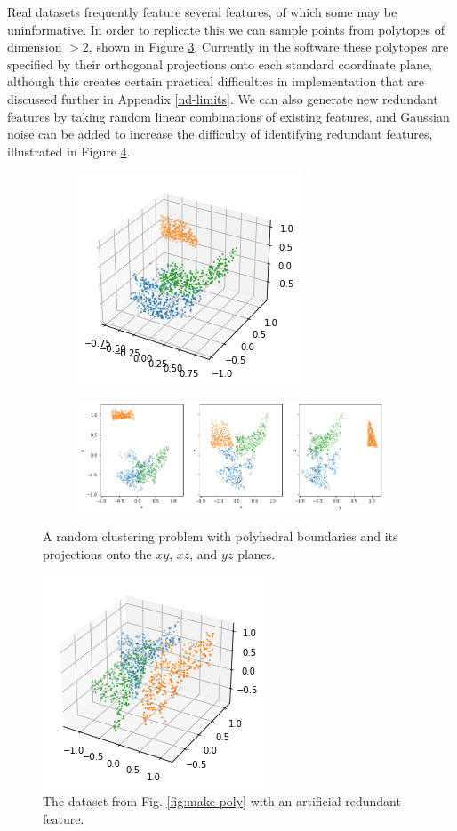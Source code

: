 \documentclass[manuscript,screen,review]{acmart}
\begin{document}
Real datasets frequently feature several features, of which some may be uninformative. In order to replicate
this we can sample points from polytopes of dimension $>2$, shown in Figure \ref{fig:3d_ex}. Currently in the software
these polytopes are specified by their orthogonal projections onto each standard coordinate plane, although this creates certain practical difficulties in implementation that are discussed further in Appendix \ref{nd-limits}. We can also generate new
redundant features by taking random linear combinations of existing features, and Gaussian noise can be added to
increase the difficulty of identifying redundant features, illustrated in Figure \ref{fig:extra-feature}.
\begin{figure}[ht]
    \centering
    \begin{subfigure}
        \centering
        \includegraphics[width=.3\textwidth]{images/poly_3d.png}
        \label{poly-3d}
    \end{subfigure}
    
    \begin{subfigure}
        \centering
        \includegraphics[width=.8\textwidth]{images/poly_3d_projs.png}
        \label{poly-3d-projs}
    \end{subfigure}
    \caption{A random clustering problem with polyhedral boundaries and its projections onto the
    $xy$, $xz$, and $yz$ planes.}
    \label{fig:3d_ex}
\end{figure}

\begin{figure}[ht]
    \centering
    \includegraphics[width=.3\textwidth]{images/extra-feature.png}
    \caption{The dataset from Fig. \ref{fig:make-poly} with an artificial redundant feature.}
    \label{fig:extra-feature}
\end{figure}
\end{document}
